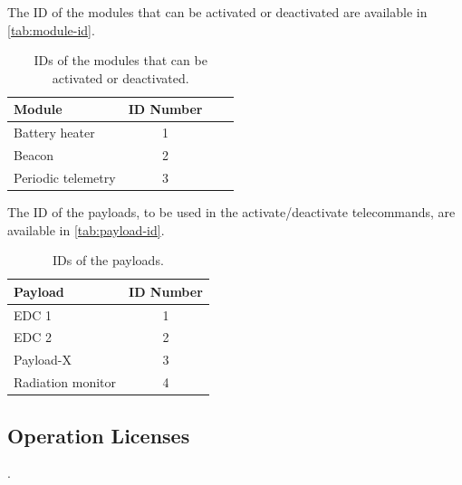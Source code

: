 The ID of the modules that can be activated or deactivated are available in \autoref{tab:module-id}.

\begin{table}[ht]
    \centering
    \begin{tabular}{lcL{0.53\textwidth}c}
        \toprule[1.5pt]
        \textbf{Module} & \textbf{ID Number} \\
        \midrule
        Battery heater      & 1 \\
        Beacon              & 2 \\
        Periodic telemetry  & 3 \\
        \bottomrule[1.5pt]
    \end{tabular}
    \caption{IDs of the modules that can be activated or deactivated.}
    \label{tab:module-id}
\end{table}

The ID of the payloads, to be used in the activate/deactivate telecommands, are available in \autoref{tab:payload-id}.

\begin{table}[ht]
    \centering
    \begin{tabular}{lc}
        \toprule[1.5pt]
        \textbf{Payload} & \textbf{ID Number} \\
        \midrule
        EDC 1               & 1 \\
        EDC 2               & 2 \\
        Payload-X           & 3 \\
        Radiation monitor   & 4 \\
        \bottomrule[1.5pt]
    \end{tabular}
    \caption{IDs of the payloads.}
    \label{tab:payload-id}
\end{table}

\subsection{Operation Licenses}

.
